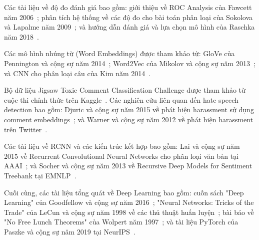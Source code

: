 \documentclass[../BTL.tex]{subfiles}
\begin{document}
Các tài liệu về độ đo đánh giá bao gồm: giới thiệu về ROC Analysis của Fawcett năm 2006~\cite{fawcett2006introduction}; phân tích hệ thống về các độ đo cho bài toán phân loại của Sokolova và Lapalme năm 2009~\cite{sokolova2009systematic}; và hướng dẫn đánh giá và lựa chọn mô hình của Raschka năm 2018~\cite{raschka2018roc}.

Các mô hình nhúng từ (Word Embeddings) được tham khảo từ: GloVe của Pennington và cộng sự năm 2014~\cite{pennington2014glove}; Word2Vec của Mikolov và cộng sự năm 2013~\cite{mikolov2013word2vec}; và CNN cho phân loại câu của Kim năm 2014~\cite{kim2014convolutional}.

Bộ dữ liệu Jigsaw Toxic Comment Classification Challenge được tham khảo từ cuộc thi chính thức trên Kaggle~\cite{kaggleJigsaw}. Các nghiên cứu liên quan đến hate speech detection bao gồm: Djuric và cộng sự năm 2015 về phát hiện harassment sử dụng comment embeddings~\cite{djuric2015hate}; và Warner và cộng sự năm 2012 về phát hiện harassment trên Twitter~\cite{warner2012detecting}.

Các tài liệu về RCNN và các kiến trúc kết hợp bao gồm: Lai và cộng sự năm 2015 về Recurrent Convolutional Neural Networks cho phân loại văn bản tại AAAI~\cite{lai2015rcnn}; và Socher và cộng sự năm 2013 về Recursive Deep Models for Sentiment Treebank tại EMNLP~\cite{socher2013recursive}.

Cuối cùng, các tài liệu tổng quát về Deep Learning bao gồm: cuốn sách "Deep Learning" của Goodfellow và cộng sự năm 2016~\cite{goodfellow2016deep}; "Neural Networks: Tricks of the Trade" của LeCun và cộng sự năm 1998 về các thủ thuật huấn luyện~\cite{lecun1998gradient}; bài báo về "No Free Lunch Theorems" của Wolpert năm 1997~\cite{wolpert1997no}; và tài liệu PyTorch của Paszke và cộng sự năm 2019 tại NeurIPS~\cite{paszke2019pytorch}.
\end{document}
